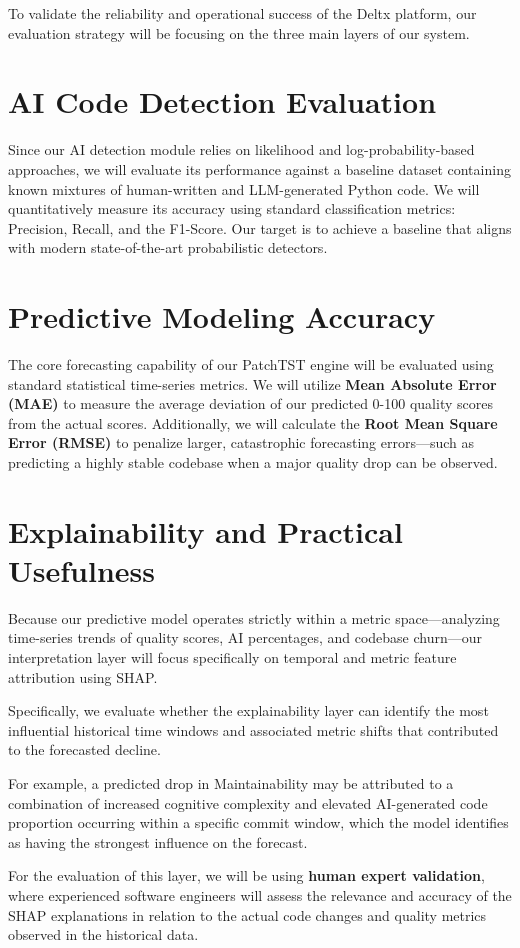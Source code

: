 To validate the reliability and operational success of the Deltx platform, our evaluation strategy will be focusing on the three main layers of our system.

\section{AI Code Detection Evaluation}

Since our AI detection module relies on likelihood and log-probability-based approaches, we will evaluate its performance against a baseline dataset containing known mixtures of human-written and LLM-generated Python code. We will quantitatively measure its accuracy using standard classification metrics: Precision, Recall, and the F1-Score. Our target is to achieve a baseline that aligns with modern state-of-the-art probabilistic detectors.

\section{Predictive Modeling Accuracy}

The core forecasting capability of our PatchTST engine will be evaluated using standard statistical time-series metrics. We will utilize \textbf{Mean Absolute Error (MAE)} to measure the average deviation of our predicted 0-100 quality scores from the actual scores. Additionally, we will calculate the \textbf{Root Mean Square Error (RMSE)} to penalize larger, catastrophic forecasting errors—such as predicting a highly stable codebase when a major quality drop can be observed.

\section{Explainability and Practical Usefulness}

Because our predictive model operates strictly within a metric space—analyzing time-series trends of quality scores, AI percentages, and codebase churn—our interpretation layer will focus specifically on temporal and metric feature attribution using SHAP.

Specifically, we evaluate whether the explainability layer can identify the most influential historical time windows and associated metric shifts that contributed to the forecasted decline.

For example, a predicted drop in Maintainability may be attributed to a combination of increased cognitive complexity and elevated AI-generated code proportion occurring within a specific commit window, which the model identifies as having the strongest influence on the forecast. 

For the evaluation of this layer, we will be using \textbf{human expert validation}, where experienced software engineers will assess the relevance and accuracy of the SHAP explanations in relation to the actual code changes and quality metrics observed in the historical data.